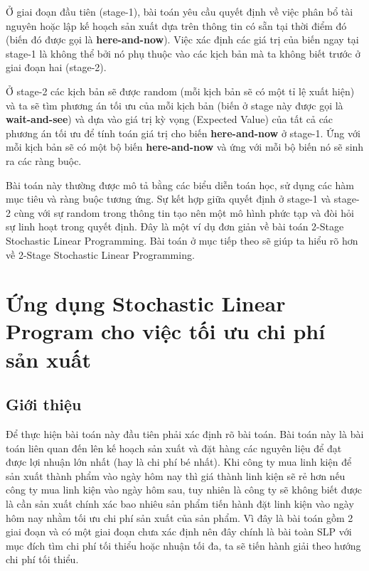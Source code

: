 \documentclass[a4paper]{article}
\begin{document}
Ở giai đoạn đầu tiên (stage-1), bài toán yêu cầu quyết định về việc phân bổ tài nguyên hoặc lập kế hoạch sản xuất dựa trên thông tin có sẵn tại thời điểm đó (biến đó được gọi là \textbf{here-and-now}). Việc xác định các giá trị của biến ngay tại stage-1 là không thể bởi nó phụ thuộc vào các kịch bản mà ta không biết trước ở giai đoạn hai (stage-2). 

Ở stage-2 các kịch bản sẽ được random (mỗi kịch bản sẽ có một tỉ lệ xuất hiện) và ta sẽ tìm phương án tối ưu của mỗi kịch bản (biến ở stage này được gọi là \textbf{wait-and-see}) và dựa vào giá trị kỳ vọng (Expected Value) của tất cả các phương án tối ưu để tính toán giá trị cho biến \textbf{here-and-now} ở stage-1. Ứng với mỗi kịch bản sẽ có một bộ biến \textbf{here-and-now} và ứng với mỗi bộ biến nó sẽ sinh ra các ràng buộc.

Bài toán này thường được mô tả bằng các biểu diễn toán học, sử dụng các hàm mục tiêu và ràng buộc tương ứng. Sự kết hợp giữa quyết định ở stage-1 và stage-2 cùng với sự random trong thông tin tạo nên một mô hình phức tạp và đòi hỏi sự linh hoạt trong quyết định. Đây là một ví dụ đơn giản về bài toán 2-Stage Stochastic Linear Programming. Bài toán ở mục tiếp theo sẽ giúp ta hiểu rõ hơn về 2-Stage Stochastic Linear Programming.

\section{Ứng dụng Stochastic Linear Program cho việc tối ưu chi phí sản xuất}
\subsection{Giới thiệu} 
 
    Để thực hiện bài toán này đầu tiên phải xác định rõ bài toán. Bài toán này là bài toán liên quan đến lên kế hoạch sản xuất và đặt hàng các nguyên liệu để đạt được lợi nhuận lớn nhất (hay là chi phí bé nhất). Khi công ty mua linh kiện để sản xuất thành phẩm  vào ngày hôm nay thì giá thành linh kiện sẽ rẻ hơn nếu công ty mua linh kiện vào ngày hôm sau, tuy nhiên là công ty sẽ không biết được là cần sản xuất chính xác bao nhiêu sản phẩm tiến hành đặt linh kiện vào ngày hôm nay nhằm tối ưu chi phí sản xuất của sản phẩm. Vì đây là bài toán gồm 2 giai đoạn và có một giai đoạn chưa xác định nên đây chính là bài toàn SLP với mục đích tìm chi phí tối thiểu hoặc nhuận tối đa, ta sẽ tiến hành giải theo hướng chi phí tối thiểu.
\end{document}
